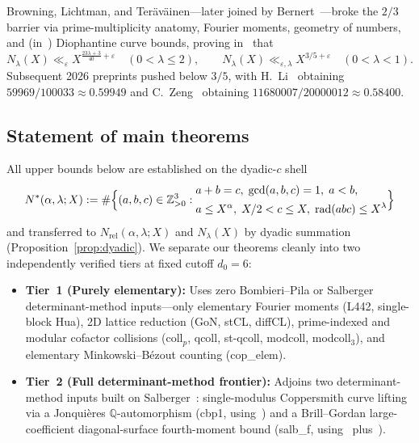 \documentclass[11pt,a4paper]{amsart}
\theoremstyle{plain}
\theoremstyle{definition}
\theoremstyle{remark}
\DeclareMathOperator{\rad}{rad}
\newcommand{\Z}{\mathbb{Z}}
\newcommand{\Q}{\mathbb{Q}}
\newcommand{\eps}{\varepsilon}
\begin{document}
Browning, Lichtman, and Ter\"av\"ainen—later joined by Bernert~\cite{BLTv1_2024,BLT2026,Bernert2025,Li2025}—broke the $2/3$ barrier via prime-multiplicity anatomy, Fourier moments, geometry of numbers, and (in~\cite{BLTv1_2024}) Diophantine curve bounds, proving in~\cite[Theorems~1.2 and~1.3]{BLT2026} that
\[
  N_\lambda(X) \ll_\eps X^{\frac{23\lambda+3}{40}+\eps} \quad (0 < \lambda \le 2), \qquad
  N_\lambda(X) \ll_{\eps,\lambda} X^{3/5+\eps} \quad (0 < \lambda < 1).
\]
Subsequent 2026 preprints pushed below $3/5$, with H.~Li~\cite{HongminLi2026} obtaining $59969/100033 \approx 0.59949$ and C.~Zeng~\cite{Zeng2026} obtaining $11680007/20000012 \approx 0.58400$.

\subsection{Statement of main theorems}

All upper bounds below are established on the dyadic-$c$ shell
\begin{equation}\label{eq:Nstar}
  N^*(\alpha,\lambda;X) := \#\Bigl\{(a,b,c) \in \Z_{>0}^3 :
  \begin{aligned}
    &a+b=c,\; \gcd(a,b,c)=1,\; a < b, \\
    &a \le X^\alpha,\; X/2 < c \le X,\; \rad(abc) \le X^\lambda
  \end{aligned}
  \Bigr\}
\end{equation}
and transferred to $N_{\mathrm{rel}}(\alpha,\lambda;X)$ and $N_\lambda(X)$ by dyadic summation (Proposition~\ref{prop:dyadic}). We separate our theorems cleanly into two independently verified tiers at fixed cutoff $d_0 = 6$:
\begin{itemize}[itemsep=2pt]
\item \textbf{Tier~1 (Purely elementary):} Uses zero Bombieri--Pila or Salberger determinant-method inputs—only elementary Fourier moments (\textsf{L442}, single-block \textsf{Hua}), 2D lattice reduction (\textsf{GoN}, \textsf{stCL}, \textsf{diffCL}), prime-indexed and modular cofactor collisions (\textsf{coll}$_p$, \textsf{qcoll}, \textsf{st-qcoll}, \textsf{modcoll}, \textsf{modcoll}$_3$), and elementary Minkowski--B\'ezout counting (\textsf{cop\_elem}).
\item \textbf{Tier~2 (Full determinant-method frontier):} Adjoins two determinant-method inputs built on Salberger~\cite{Salberger2023}: single-modulus Coppersmith curve lifting via a Jonqui\`eres $\Q$-automorphism (\textsf{cbp1}, using~\cite[Theorem~1.2]{Salberger2023}) and a Brill--Gordan large-coefficient diagonal-surface fourth-moment bound (\textsf{salb\_f}, using~\cite[Theorem~3.16, Theorem~6.3, Corollary~6.5, and Theorem~9.4(b)]{Salberger2023} plus~\cite{ColliotThelene2002}).
\end{itemize}
\end{document}
